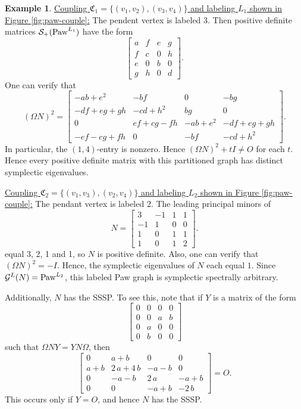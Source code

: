 \documentclass[12pt]{article}
\theoremstyle{definition}
\theoremstyle{definition}
\theoremstyle{definition}
\newtheorem{ex}[thm]{Example}
\numberwithin{figure}{section}
\numberwithin{equation}{section}
\newcommand{\PP}{\mathfrak{C}}
\newcommand{\G}{\mathcal{G}}
\newcommand{\symp}{\mathcal{S}_+}
\newcommand{\noi}{\noindent}
\begin{document}
\begin{ex}
\noi\underline{Coupling $\PP_1=
\{(v_1,v_2),(v_3,v_4)\}$ {and labeling $L_1$ shown in Figure \ref{fig:paw-couple}}:} The pendent vertex is labeled $3$.
Then positive definite matrices {$\symp({\rm Paw}^{L_1})$}  have the form 
\[
\left[\begin{array}{rrrr}
a & f & e & g \\
f & c & 0 & h \\
e & 0 & b & 0 \\
g & h & 0 & d
\end{array}\right] {.}
\] 
One can verify that 
\[
(\Omega N)^2= 
\left[\begin{array}{rrrr}
-a b + e^{2} & -b f & 0 & -b g \\
-d f + e g + g h & -c d + h^{2} & b g & 0 \\
0 & e f + c g - f h & -a b + e^{2} & -d f + e g + g h \\
-e f - c g + f h & 0 & -b f & -c d + h^{2}
\end{array}\right] {.}
\] 
In particular, the $(1,4)$-entry is nonzero. 
Hence $(\Omega N)^2 +tI \neq O$ for each $t$.  Hence every positive definite matrix 
with this partitioned graph has distinct symplectic eigenvalues.
\bigskip



\noi\underline{Coupling $\PP_2=\{(v_1,v_3),(v_2,v_4)\}$ {and labeling $L_2$ shown in Figure \ref{fig:paw-couple}}:} 
The pendant vertex  is labeled 2. 
 The leading principal minors of
\[ 
 N=
\left[ \begin{array}{rrrr}
 3 &-1 &  1&  1 \\
-1 &  1 &  0&   0 \\
1 &  0&  1 & 1\\
 1 & 0 & 1 & 2
 \end{array} \right].
\] 
 equal 3, 2, 1 and 1{, so} 
$N$ is positive definite.  
Also, one can verify that  $(\Omega N)^2=-I$. Hence, the symplectic eigenvalues of $N$ each equal $1$. 
 {Since $\G^L(N)={\rm Paw}^{L_2}$,} this labeled  Paw graph is symplectic spectrally arbitrary.

Additionally, $N$ has the SSSP.  To see this, 
note that if $Y$ is a matrix of the form
\[ \left[\begin{array}{rrrr}
0 & 0 & 0 & 0 \\
0 & 0 & a & b \\
0 & a & 0 & 0 \\
0 & b & 0 & 0
\end{array}\right] 
\]
such that 
$\Omega NY= YN\Omega$, then 
\[ \left[\begin{array}{rrrr}
0 & a + b & 0 & 0 \\
a + b & 2 \, a + 4 \, b & -a - b & 0 \\
0 & -a - b & 2 \, a & -a + b \\
0 & 0 & -a + b & -2 \, b
\end{array}\right]=O.\]
This occurs only if $Y=O$, and hence $N$ has the SSSP.  
\end{ex}
\end{document}
